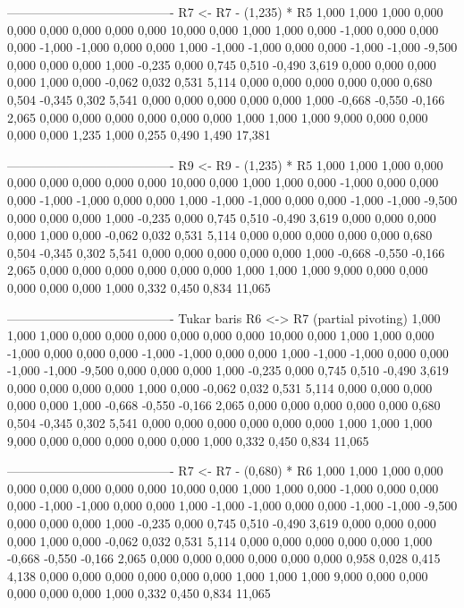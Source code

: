 \documentclass[12pt]{article}
\begin{document}
\begin{enumerate}
\begin{keluaran}
----------------------------------------
R7 <- R7 - (1,235) * R5
1,000   1,000   1,000   0,000   0,000   0,000   0,000   0,000   0,000   10,000
0,000   1,000   1,000   0,000   -1,000  0,000   0,000   0,000   -1,000  -1,000
0,000   0,000   1,000   -1,000  -1,000  0,000   0,000   -1,000  -1,000  -9,500
0,000   0,000   0,000   1,000   -0,235  0,000   0,745   0,510   -0,490  3,619
0,000   0,000   0,000   0,000   1,000   0,000   -0,062  0,032   0,531   5,114
0,000   0,000   0,000   0,000   0,000   0,680   0,504   -0,345  0,302   5,541
0,000   0,000   0,000   0,000   0,000   1,000   -0,668  -0,550  -0,166  2,065
0,000   0,000   0,000   0,000   0,000   0,000   1,000   1,000   1,000   9,000
0,000   0,000   0,000   0,000   1,235   1,000   0,255   0,490   1,490   17,381

----------------------------------------
R9 <- R9 - (1,235) * R5
1,000   1,000   1,000   0,000   0,000   0,000   0,000   0,000   0,000   10,000
0,000   1,000   1,000   0,000   -1,000  0,000   0,000   0,000   -1,000  -1,000
0,000   0,000   1,000   -1,000  -1,000  0,000   0,000   -1,000  -1,000  -9,500
0,000   0,000   0,000   1,000   -0,235  0,000   0,745   0,510   -0,490  3,619
0,000   0,000   0,000   0,000   1,000   0,000   -0,062  0,032   0,531   5,114
0,000   0,000   0,000   0,000   0,000   0,680   0,504   -0,345  0,302   5,541
0,000   0,000   0,000   0,000   0,000   1,000   -0,668  -0,550  -0,166  2,065
0,000   0,000   0,000   0,000   0,000   0,000   1,000   1,000   1,000   9,000
0,000   0,000   0,000   0,000   0,000   1,000   0,332   0,450   0,834   11,065

----------------------------------------
Tukar baris R6 <-> R7 (partial pivoting)
1,000   1,000   1,000   0,000   0,000   0,000   0,000   0,000   0,000   10,000
0,000   1,000   1,000   0,000   -1,000  0,000   0,000   0,000   -1,000  -1,000
0,000   0,000   1,000   -1,000  -1,000  0,000   0,000   -1,000  -1,000  -9,500
0,000   0,000   0,000   1,000   -0,235  0,000   0,745   0,510   -0,490  3,619
0,000   0,000   0,000   0,000   1,000   0,000   -0,062  0,032   0,531   5,114
0,000   0,000   0,000   0,000   0,000   1,000   -0,668  -0,550  -0,166  2,065
0,000   0,000   0,000   0,000   0,000   0,680   0,504   -0,345  0,302   5,541
0,000   0,000   0,000   0,000   0,000   0,000   1,000   1,000   1,000   9,000
0,000   0,000   0,000   0,000   0,000   1,000   0,332   0,450   0,834   11,065

----------------------------------------
R7 <- R7 - (0,680) * R6
1,000   1,000   1,000   0,000   0,000   0,000   0,000   0,000   0,000   10,000
0,000   1,000   1,000   0,000   -1,000  0,000   0,000   0,000   -1,000  -1,000
0,000   0,000   1,000   -1,000  -1,000  0,000   0,000   -1,000  -1,000  -9,500
0,000   0,000   0,000   1,000   -0,235  0,000   0,745   0,510   -0,490  3,619
0,000   0,000   0,000   0,000   1,000   0,000   -0,062  0,032   0,531   5,114
0,000   0,000   0,000   0,000   0,000   1,000   -0,668  -0,550  -0,166  2,065
0,000   0,000   0,000   0,000   0,000   0,000   0,958   0,028   0,415   4,138
0,000   0,000   0,000   0,000   0,000   0,000   1,000   1,000   1,000   9,000
0,000   0,000   0,000   0,000   0,000   1,000   0,332   0,450   0,834   11,065


\end{keluaran}
\end{enumerate}
\end{document}
